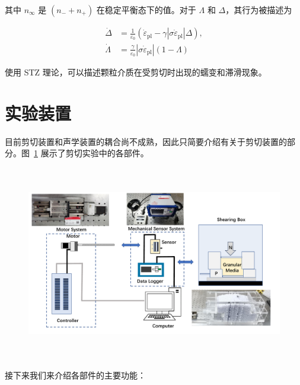 其中 $n_{\infty}$ 是 $(n_{-} + n_{+})$ 在稳定平衡态下的值。对于 $\Lambda$ 和 $\Delta$，其行为被描述为

\begin{align}
  \dot{\Delta} &= \frac{1}{\varepsilon_{0}}\left(\dot{\varepsilon}_{\text{pl}} - \gamma|\sigma\dot{\varepsilon}_{\text{pl}}|\Delta\right),\\
  \dot{\Lambda} &= \frac{\gamma}{\varepsilon_{0}}\left|\sigma\dot{\varepsilon}_{\text{pl}}\right|(1-\Lambda)
\end{align}

使用 STZ 理论，可以描述颗粒介质在受剪切时出现的蠕变和滞滑现象。

\section{实验装置}

目前剪切装置和声学装置的耦合尚不成熟，因此只简要介绍有关于剪切装置的部分。图~\ref{fig:apparatus_2} 展示了剪切实验中的各部件。

\begin{figure}[!htp]
    \centering
    \includegraphics[height=8.5cm]{figures/4_apparatus.pdf}
    \label{fig:apparatus_2}
  \end{figure}

接下来我们来介绍各部件的主要功能：

